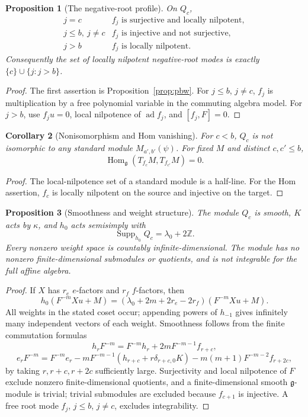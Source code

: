 \documentclass[11pt,a4paper]{article}
\newcommand{\Z}{\mathbb Z}
\newcommand{\g}{\mathfrak g}
\newcommand{\ad}{\operatorname{ad}}
\newcommand{\Hom}{\operatorname{Hom}}
\newcommand{\Supp}{\operatorname{Supp}}
\theoremstyle{plainupright}
\newtheorem{proposition}{Proposition}[section]
\newtheorem{corollary}[proposition]{Corollary}
\begin{document}
\begin{proposition}[The negative-root profile]\label{prop:root}
On \(Q_c\),
\[
\begin{array}{c|l}
j=c&f_j\text{ is surjective and locally nilpotent},\\
j\le b,\ j\ne c&f_j\text{ is injective and not surjective},\\
j>b&f_j\text{ is locally nilpotent}.
\end{array}
\]
Consequently the set of locally nilpotent negative-root modes is exactly
\(\{c\}\cup\{j:j>b\}\).
\end{proposition}

\begin{proof}
The first assertion is Proposition~\ref{prop:pbw}. For \(j\le b\), \(j\ne c\),
\(f_j\) is multiplication by a free polynomial variable in the commuting
algebra model. For \(j>b\), use \(f_ju=0\), local nilpotence of \(\ad f_j\),
and \([f_j,F]=0\).
\end{proof}

\begin{corollary}[Nonisomorphism and Hom vanishing]\label{cor:hom}
For \(c<b\), \(Q_c\) is not isomorphic to any standard module
\(M_{a',b'}(\psi)\). For fixed \(M\) and distinct \(c,c'\le b\),
\[
\Hom_\g(T_{f_c}M,T_{f_{c'}}M)=0.
\]
\end{corollary}

\begin{proof}
The local-nilpotence set of a standard module is a half-line. For the Hom
assertion, \(f_c\) is locally nilpotent on the source and injective on the
target.
\end{proof}

\begin{proposition}[Smoothness and weight structure]\label{prop:smooth}
The module \(Q_c\) is smooth, \(K\) acts by \(\kappa\), and \(h_0\) acts
semisimply with
\[
\Supp_{h_0}Q_c=\lambda_0+2\Z.
\]
Every nonzero weight space is countably infinite-dimensional. The module has
no nonzero finite-dimensional submodules or quotients, and is not integrable
for the full affine algebra.
\end{proposition}

\begin{proof}
If \(X\) has \(r_e\) \(e\)-factors and \(r_f\) \(f\)-factors, then
\[
h_0(F^{-m}Xu+M)=(\lambda_0+2m+2r_e-2r_f)(F^{-m}Xu+M).
\]
All weights in the stated coset occur; appending powers of \(h_{-1}\) gives
infinitely many independent vectors of each weight. Smoothness follows from
the finite commutation formulas
\[
h_rF^{-m}=F^{-m}h_r+2mF^{-m-1}f_{r+c},
\]
\[
e_rF^{-m}=F^{-m}e_r-mF^{-m-1}(h_{r+c}+r\delta_{r+c,0}K)
-m(m+1)F^{-m-2}f_{r+2c},
\]
by taking \(r,r+c,r+2c\) sufficiently large. Surjectivity and local
nilpotence of \(F\) exclude nonzero finite-dimensional quotients, and a
finite-dimensional smooth \(\g\)-module is trivial; trivial submodules are
excluded because \(f_{c+1}\) is injective. A free root mode \(f_j\),
\(j\le b\), \(j\ne c\), excludes integrability.
\end{proof}
\end{document}
